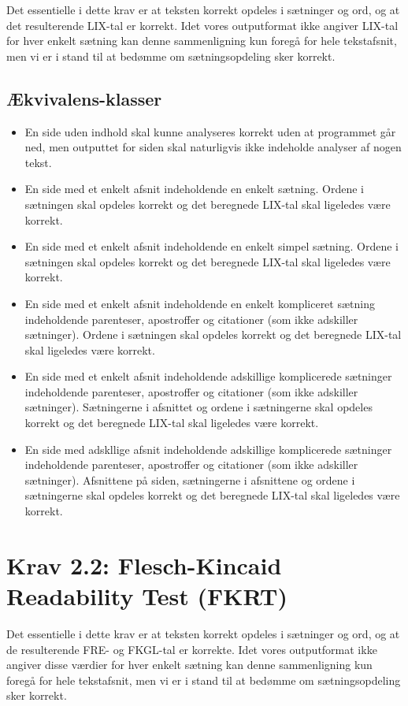 \documentclass[a4paper,oneside,article, titlepage]{memoir}
\begin{document}
Det essentielle i dette krav er at teksten korrekt opdeles i sætninger
og ord, og at det resulterende LIX-tal er korrekt. Idet vores
outputformat ikke angiver LIX-tal for hver enkelt sætning kan denne
sammenligning kun foregå for hele tekstafsnit, men vi er i stand til
at bedømme om sætningsopdeling sker korrekt.

\subsection{Ækvivalens-klasser}
\begin{itemize}
\item En side uden indhold skal kunne analyseres korrekt uden at
  programmet går ned, men outputtet for siden skal naturligvis ikke
  indeholde analyser af nogen tekst.
\item En side med et enkelt afsnit indeholdende en enkelt
  sætning. Ordene i sætningen skal opdeles korrekt og det beregnede
  LIX-tal skal ligeledes være korrekt.
\item En side med et enkelt afsnit indeholdende en enkelt simpel
  sætning. Ordene i sætningen skal opdeles korrekt og det beregnede
  LIX-tal skal ligeledes være korrekt.
\item En side med et enkelt afsnit indeholdende en enkelt kompliceret
  sætning indeholdende parenteser, apostroffer og citationer (som ikke
  adskiller sætninger). Ordene i sætningen skal opdeles korrekt og det
  beregnede LIX-tal skal ligeledes være korrekt.
\item En side med et enkelt afsnit indeholdende adskillige
  komplicerede sætninger indeholdende parenteser, apostroffer og
  citationer (som ikke adskiller sætninger). Sætningerne i afsnittet
  og ordene i sætningerne skal opdeles korrekt og det beregnede
  LIX-tal skal ligeledes være korrekt.
\item En side med adskllige afsnit indeholdende adskillige
  komplicerede sætninger indeholdende parenteser, apostroffer og
  citationer (som ikke adskiller sætninger). Afsnittene på siden,
  sætningerne i afsnittene og ordene i sætningerne skal opdeles
  korrekt og det beregnede LIX-tal skal ligeledes være korrekt.
\end{itemize}

\section*{Krav 2.2: Flesch-Kincaid Readability Test (FKRT)}

Det essentielle i dette krav er at teksten korrekt opdeles i sætninger
og ord, og at de resulterende FRE- og FKGL-tal er korrekte. Idet vores
outputformat ikke angiver disse værdier for hver enkelt sætning kan
denne sammenligning kun foregå for hele tekstafsnit, men vi er i stand
til at bedømme om sætningsopdeling sker korrekt.
\end{document}
